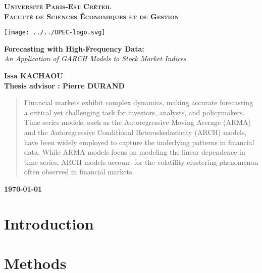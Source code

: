 \documentclass[a4paper, 12pt]{article}
\begin{document}
	\begin{titlepage}
		
		\centering
\textsc{{\LARGE \textbf{Université Paris-Est Créteil}}} \\
\vspace*{0.5cm}
\textsc{{\LARGE \textbf{Faculté de Sciences Économiques et de Gestion}}}
\vspace*{1cm}

\begin{center}
	\texttt{[image: ../../UPEC-logo.svg]}
\end{center}
\vspace*{1cm}

\LARGE

\textbf{Forecasting with High-Frequency Data:}\\
\textit{An Application of GARCH Models to Stock Market Indices}\\
\vspace{1cm}		
\Large

\vspace{0cm}

\textbf{Issa KACHAOU}\\
\large
\textbf{Thesis advisor : Pierre DURAND} \\
\begin{abstract}
	\noindent
	Financial markets exhibit complex dynamics, making accurate forecasting a critical yet challenging task for investors, analysts, and policymakers. Time series models, such as the Autoregressive Moving Average (ARMA) and the Autoregressive Conditional Heteroskedasticity (ARCH) models, have been widely employed to capture the underlying patterns in financial data. While ARMA models focus on modeling the linear dependence in time series, ARCH models account for the volatility clustering phenomenon often observed in financial markets.
\end{abstract}


\vfill

\Large

\textbf{\today}
		
	\end{titlepage}

\pagestyle{plain}
\part{Introduction}


\part{Methods}
\end{document}
